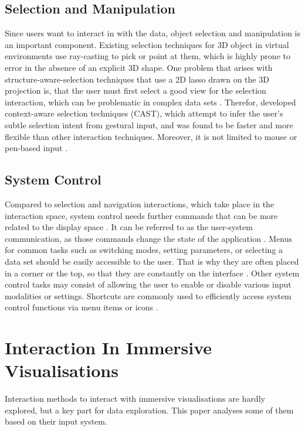 \subsection{Selection and Manipulation}
\label{subsection:Selection and Manipulation}
Since users want to interact in with the data, object selection and manipulation is an important component. Existing selection techniques for 3D object in virtual environments use ray-casting to pick or point at them, which is highly prone to error in the absence of an explicit 3D shape\autocite[1]{Yu2016}. One problem that arises with structure-aware-selection techniques that use a 2D lasso drawn on the 3D projection is, that the user must first select a good view for the selection interaction, which can be problematic in complex data sets \autocite[1]{Yu2016}. Therefor, \cite{Yu2016} developed context-aware selection techniques (CAST), which attempt to infer the user's subtle selection intent from gestural input, and was found to be faster and more flexible than other interaction techniques. Moreover, it is not limited to mouse or pen-based input \autocite{Yu2016}.

\subsection{System Control}
\label{subsection:System Control}
Compared to selection and navigation interactions, which take place in the interaction space, system control needs further commands that can be more related to the display space \autocite[48]{Cordeil2017}. It can be referred to as the user-system communication, as those commands change the state of the application \autocite[]{Jankowski2014}.
Menus for common tasks such as switching modes, setting parameters, or selecting a data set should be easily accessible to the user. That is why they are often placed in a corner or the top, so that they are constantly on the interface \autocite[885]{Besancon2017}. Other system control tasks may consist of allowing the user to enable or disable various input modalities or settings. Shortcuts are commonly used to efficiently access system control functions via menu items or icons \autocite[]{Jankowski2014}. \newline

\section{Interaction In Immersive Visualisations}
Interaction methods to interact with immersive visualisations are hardly explored, but a key part for data exploration. This paper analyses some of them based on their input system.
\label{section:Interaction Techniques Immersive}

